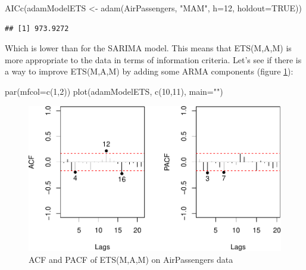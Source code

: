 \documentclass[
]{book}
\newenvironment{Shaded}{\begin{snugshade}}{\end{snugshade}}
\newcommand{\AttributeTok}[1]{\textcolor[rgb]{0.77,0.63,0.00}{#1}}
\newcommand{\ConstantTok}[1]{\textcolor[rgb]{0.00,0.00,0.00}{#1}}
\newcommand{\DecValTok}[1]{\textcolor[rgb]{0.00,0.00,0.81}{#1}}
\newcommand{\FunctionTok}[1]{\textcolor[rgb]{0.00,0.00,0.00}{#1}}
\newcommand{\NormalTok}[1]{#1}
\newcommand{\OtherTok}[1]{\textcolor[rgb]{0.56,0.35,0.01}{#1}}
\newcommand{\StringTok}[1]{\textcolor[rgb]{0.31,0.60,0.02}{#1}}
\theoremstyle{definition}
\theoremstyle{definition}
\theoremstyle{definition}
\theoremstyle{definition}
\theoremstyle{remark}
\begin{document}
\begin{Shaded}
\begin{Highlighting}[]
\FunctionTok{AICc}\NormalTok{(adamModelETS }\OtherTok{\textless{}{-}} \FunctionTok{adam}\NormalTok{(AirPassengers, }\StringTok{"MAM"}\NormalTok{,}
                          \AttributeTok{h=}\DecValTok{12}\NormalTok{, }\AttributeTok{holdout=}\ConstantTok{TRUE}\NormalTok{))}
\end{Highlighting}
\end{Shaded}

\begin{verbatim}
## [1] 973.9272
\end{verbatim}

Which is lower than for the SARIMA model. This means that ETS(M,A,M) is more appropriate to the data in terms of information criteria. Let's see if there is a way to improve ETS(M,A,M) by adding some ARMA components (figure \ref{fig:adamETSPlotAirACFPACF}):

\begin{Shaded}
\begin{Highlighting}[]
\FunctionTok{par}\NormalTok{(}\AttributeTok{mfcol=}\FunctionTok{c}\NormalTok{(}\DecValTok{1}\NormalTok{,}\DecValTok{2}\NormalTok{))}
\FunctionTok{plot}\NormalTok{(adamModelETS, }\FunctionTok{c}\NormalTok{(}\DecValTok{10}\NormalTok{,}\DecValTok{11}\NormalTok{), }\AttributeTok{main=}\StringTok{""}\NormalTok{)}
\end{Highlighting}
\end{Shaded}

\begin{figure}
\centering
\includegraphics{adam_files/figure-latex/adamETSPlotAirACFPACF-1.pdf}
\caption{\label{fig:adamETSPlotAirACFPACF}ACF and PACF of ETS(M,A,M) on AirPassengers data}
\end{figure}
\end{document}
